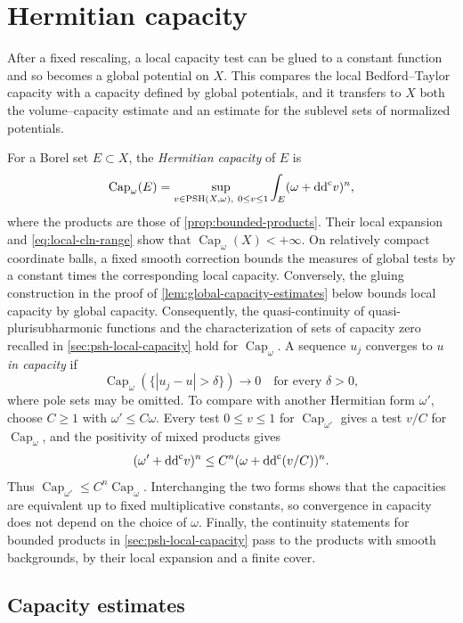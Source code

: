 \section{Hermitian capacity}
\label{sec:hermitian-capacity}

After a fixed rescaling, a local capacity test can be glued to a constant function and so becomes a global potential on $X$. This compares the local Bedford--Taylor capacity with a capacity defined by global potentials, and it transfers to $X$ both the volume--capacity estimate and an estimate for the sublevel sets of normalized potentials.

For a Borel set $E\subset X$, the \emph{Hermitian capacity} of $E$ is
\[
 \operatorname{Cap}_\omega(E)
 =\sup_{v\in\mathrm{PSH}(X,\omega),\ 0\leq v\leq1}
             \int_E(\omega+\mathrm{dd}^{\mathrm{c}} v)^n,
\]
where the products are those of \cref{prop:bounded-products}. Their local expansion and \eqref{eq:local-cln-range} show that $\operatorname{Cap}_\omega(X)<+\infty$. On relatively compact coordinate balls, a fixed smooth correction bounds the measures of global tests by a constant times the corresponding local capacity. Conversely, the gluing construction in the proof of \cref{lem:global-capacity-estimates} below bounds local capacity by global capacity. Consequently, the quasi-continuity of quasi-plurisubharmonic functions and the characterization of sets of capacity zero recalled in \cref{sec:psh-local-capacity} hold for $\operatorname{Cap}_\omega$. A sequence $u_j$ converges to $u$ \emph{in capacity} if
\[
 \operatorname{Cap}_\omega(\{|u_j-u|>\delta\})\longrightarrow0
 \quad\text{for every }\delta>0,
\]
where pole sets may be omitted. To compare with another Hermitian form $\omega'$, choose $C\geq1$ with $\omega'\leq C\omega$. Every test $0\leq v\leq1$ for $\operatorname{Cap}_{\omega'}$ gives a test $v/C$ for $\operatorname{Cap}_\omega$, and the positivity of mixed products gives
\[
 (\omega'+\mathrm{dd}^{\mathrm{c}} v)^n\leq C^n(\omega+\mathrm{dd}^{\mathrm{c}}(v/C))^n.
\]
Thus $\operatorname{Cap}_{\omega'}\leq C^n\operatorname{Cap}_\omega$. Interchanging the two forms shows that the capacities are equivalent up to fixed multiplicative constants, so convergence in capacity does not depend on the choice of $\omega$. Finally, the continuity statements for bounded products in \cref{sec:psh-local-capacity} pass to the products with smooth backgrounds, by their local expansion and a finite cover.

\subsection{Capacity estimates}


